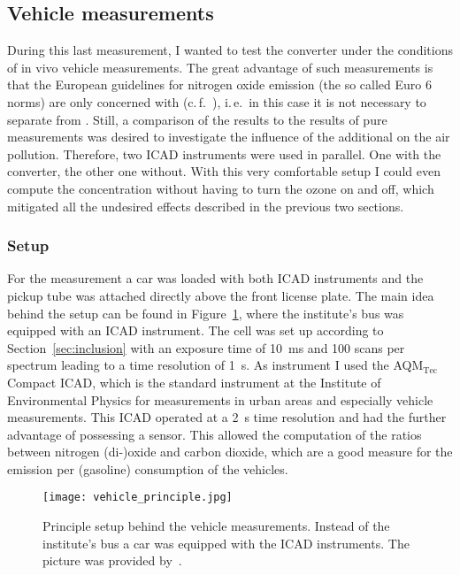 \subsection{Vehicle measurements}
\label{sec:vehicle}

During this last measurement, I wanted to test the converter under the
conditions of in vivo vehicle measurements. The great advantage of
such measurements is that the European guidelines for nitrogen oxide
emission (the so called Euro 6 norms) are only concerned with
 (c.\,f.~\cite{eu}), i.\,e.\ in this case it is not necessary
to separate  from . Still, a comparison of the
 results to the results of pure  measurements was
desired to investigate the influence of the additional  on the
air pollution. Therefore, two ICAD instruments were used in
parallel. One with the converter, the other one without. With this
very comfortable setup I could even compute the  concentration
without having to turn the ozone on and off, which mitigated all the
undesired effects described in the previous two sections.

\subsubsection{Setup}
\label{sec:vehicle-setup}

For the measurement a car was loaded with both ICAD instruments and
the pickup tube was attached directly above the front license
plate. The main idea behind the setup can be found in
Figure~\ref{fig:hd-principle}, where the institute's bus was equipped
with an ICAD instrument. The  cell was set up according to
Section~\ref{sec:inclusion} with an exposure time of
\SI{10}{\milli\second} and 100 scans per spectrum leading to a time
resolution of \SI{1}{\second}. As  instrument I used the
AQM$_{\text{Tec}}$ Compact ICAD, which is the standard instrument at
the Institute of Environmental Physics for  measurements in
urban areas and especially vehicle measurements. This  ICAD
operated at a \SI{2}{\second} time resolution and had the further
advantage of possessing a  sensor. This allowed the
computation of the ratios between nitrogen (di-)oxide and carbon
dioxide, which are a good measure for the emission per (gasoline)
consumption of the vehicles.

\begin{figure}[htbp]
  \centering
  \texttt{[image: vehicle\_principle.jpg]}
  \caption{Principle setup behind the vehicle measurements. Instead of
    the institute's bus a car was equipped with the ICAD
    instruments. The picture was provided by~\cite{denis}.}
  \label{fig:hd-principle}
\end{figure}

